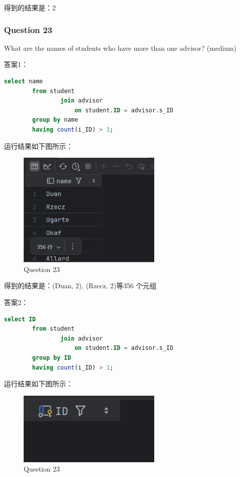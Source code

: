 \documentclass{article}
\begin{document}
    得到的结果是：2
    
    \subsubsection{Question 23}
    
    What are the names of students who have more than one advisor? (medium)
    
    答案1：
    
    \begin{lstlisting}[language=sql, title=Question 23, tabsize=4]
    	select name
    	from student
    			join advisor
    				on student.ID = advisor.s_ID
    	group by name
    	having count(i_ID) > 1;
    \end{lstlisting}
    
    运行结果如下图所示：
    
    \begin{figure}[H]
    	\centering
    	\includegraphics[width=7cm]{./images/27.Question23-ans1.png}
    	\caption{Question 23}
    \end{figure}
    
    得到的结果是：(Duan, 2), (Rzecz, 2)等356 个元组
    
    
    答案2：
    
    \begin{lstlisting}[language=sql, title=Question 23, tabsize=4]
    	select ID
    	from student
    			join advisor
    				on student.ID = advisor.s_ID
    	group by ID
    	having count(i_ID) > 1;
    \end{lstlisting}
    
    运行结果如下图所示：
    
    \begin{figure}[H]
    	\centering
    	\includegraphics[width=7cm]{./images/27.Question23-ans2.png}
    	\caption{Question 23}
    \end{figure}
    
\end{document}
